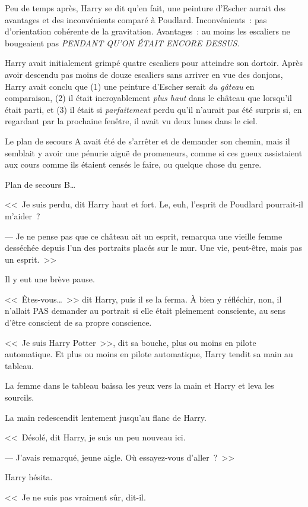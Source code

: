 Peu de temps après, Harry se dit qu'en fait, une peinture d'Escher aurait des avantages et des inconvénients comparé à Poudlard. Inconvénients~: pas d'orientation cohérente de la gravitation. Avantages~: au moins les escaliers ne bougeaient pas \emph{PENDANT QU'ON ÉTAIT ENCORE DESSUS}.

Harry avait initialement grimpé quatre escaliers pour atteindre son dortoir. Après avoir descendu pas moins de douze escaliers sans arriver en vue des donjons, Harry avait conclu que (1) une peinture d'Escher serait \emph{du gâteau} en comparaison, (2) il était incroyablement \emph{plus haut} dans le château que lorsqu'il était parti, et (3) il était si \emph{parfaitement} perdu qu'il n'aurait pas été surpris si, en regardant par la prochaine fenêtre, il avait vu deux lunes dans le ciel.

Le plan de secours A avait été de s'arrêter et de demander son chemin, mais il semblait y avoir une pénurie aiguë de promeneurs, comme si ces gueux assistaient aux cours comme ils étaient censés le faire, ou quelque chose du genre.

Plan de secours B…

<<~Je suis perdu, dit Harry haut et fort. Le, euh, l'esprit de Poudlard pourrait-il m'aider~?

--- Je ne pense pas que ce château ait un esprit, remarqua une vieille femme desséchée depuis l'un des portraits placés sur le mur. Une vie, peut-être, mais pas un esprit.~>>

Il y eut une brève pause.

<<~Êtes-vous…~>> dit Harry, puis il se la ferma. À bien y réfléchir, non, il n'allait PAS demander au portrait si elle était pleinement consciente, au sens d'être conscient de sa propre conscience.

<<~Je suis Harry Potter~>>, dit sa bouche, plus ou moins en pilote automatique. Et plus ou moins en pilote automatique, Harry tendit sa main au tableau.

La femme dans le tableau baissa les yeux vers la main et Harry et leva les sourcils.

La main redescendit lentement jusqu'au flanc de Harry.

<<~Désolé, dit Harry, je suis un peu nouveau ici.

--- J'avais remarqué, jeune aigle. Où essayez-vous d'aller~?~>>

Harry hésita.

<<~Je ne suis pas vraiment sûr, dit-il.

